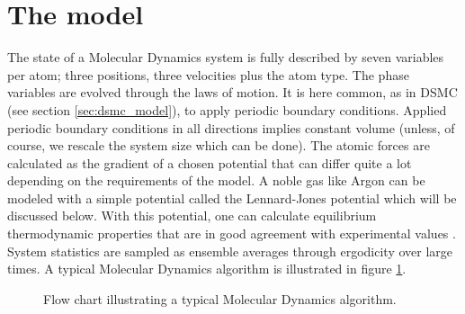 \section{The model}
\label{sec:md_model}
The state of a Molecular Dynamics system is fully described by seven variables per atom; three positions, three velocities plus the atom type. The phase variables are evolved through the laws of motion. It is here common, as in DSMC (see section \ref{sec:dsmc_model}), to apply periodic boundary conditions. Applied periodic boundary conditions in all directions implies constant volume (unless, of course, we rescale the system size which can be done). The atomic forces are calculated as the gradient of a chosen potential that can differ quite a lot depending on the requirements of the model. A noble gas like Argon can be modeled with a simple potential called the Lennard-Jones potential which will be discussed below. With this potential, one can calculate equilibrium thermodynamic properties that are in good agreement with experimental values \cite{verlet1967computer}. System statistics are sampled as ensemble averages through ergodicity over large times. A typical Molecular Dynamics algorithm is illustrated in figure \ref{fig:flow_simple_md}.
\begin{figure}[h]
\centering
\caption{Flow chart illustrating a typical Molecular Dynamics algorithm.}
\label{fig:flow_simple_md}
\end{figure}